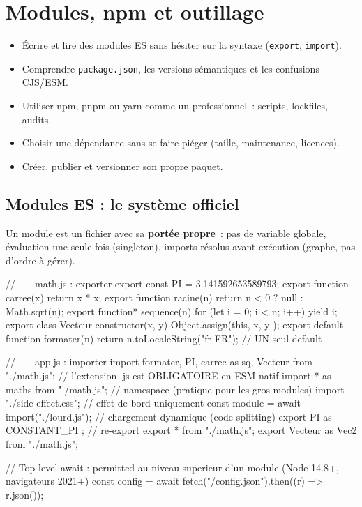 \documentclass[12pt,a4paper,twoside,openright]{book}
\begin{document}
\chapter{Modules, npm et outillage}
\label{ch-js-modules}

\begin{objectif}
\begin{itemize}
  \item \'Ecrire et lire des modules ES sans h\'esiter sur la syntaxe (\texttt{export}, \texttt{import}).
  \item Comprendre \texttt{package.json}, les versions s\'emantiques et les confusions CJS/ESM.
  \item Utiliser npm, pnpm ou yarn comme un professionnel~: scripts, lockfiles, audits.
  \item Choisir une d\'ependance sans se faire pi\'eger (taille, maintenance, licences).
  \item Cr\'eer, publier et versionner son propre paquet.
\end{itemize}
\end{objectif}

\section{Modules ES : le syst\`eme officiel}

Un module est un fichier avec sa \textbf{port\'ee propre}~: pas de variable globale, \'evaluation
une seule fois (singleton), imports r\'esolus avant ex\'ecution (graphe, pas d'ordre \`a g\'erer).

\begin{codejs}
// ---- math.js : exporter
export const PI = 3.141592653589793;
export function carree(x) { return x * x; }
export function racine(n) { return n < 0 ? null : Math.sqrt(n); }
export function* sequence(n) { for (let i = 0; i < n; i++) yield i; }
export class Vecteur { constructor(x, y) { Object.assign(this, { x, y }); } }
export default function formater(n) { return n.toLocaleString("fr-FR"); }   // UN seul default

// ---- app.js : importer
import formater, { PI, carree as sq, Vecteur } from "./math.js";      // l'extension .js est OBLIGATOIRE en ESM natif
import * as maths from "./math.js";                                    // namespace (pratique pour les gros modules)
import "./side-effect.css";                                            // effet de bord uniquement
const module = await import("./lourd.js");                             // chargement dynamique (code splitting)
export { PI as CONSTANT_PI };                                          // re-export
export * from "./math.js";
export { Vecteur as Vec2 } from "./math.js";

// Top-level await : permitted au niveau superieur d'un module (Node 14.8+, navigateurs 2021+)
const config = await fetch("/config.json").then((r) => r.json());
\end{codejs}
\end{document}
